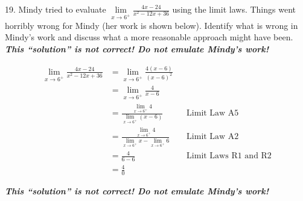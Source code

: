 \documentclass[12pt,]{book}
\newcommand{\alert}[1]{\textbf{\textit{#1}}}
\theoremstyle{plain}
\theoremstyle{definition}
\theoremstyle{definition}
\theoremstyle{definition}
\theoremstyle{definition}
\theoremstyle{definition}
\numberwithin{equation}{section}
\begin{document}
\begin{exerciselist}
\begin{exercisegroup}
\end{exercisegroup}
\par\smallskip\noindent
\item[19.]\hypertarget{exercise-108}{}Mindy tried to evaluate \(\lim\limits_{x\to6^{+}}\frac{4x-24}{x^2-12x+36}\) using the limit laws. Things went horribly wrong for Mindy (her work is shown below). Identify what is wrong in Mindy's work and discuss what a more reasonable approach might have been. \alert{This ``solution'' is not correct! Do not emulate Mindy's work!}%
\par
\begin{align*}
\lim_{x\to6^{+}}\frac{4x-24}{x^2-12x+36}&=\lim_{x\to6^{+}}\frac{4(x-6)}{(x-6)^2}\\
&=\lim_{x\to6^{+}}\frac{4}{x-6}\\
&=\frac{\lim\limits_{x\to6^{+}}4}{\lim\limits_{x\to6^{+}}(x-6)}&&\text{Limit Law A5}\\
&=\frac{\lim\limits_{x\to6^{+}}4}{\lim\limits_{x\to6^{+}}x-\lim\limits_{x\to6^{+}}6}&&\text{Limit Law A2}\\
&=\frac{4}{6-6}&&\text{Limit Laws R1 and R2}\\
&=\frac{4}{0}
\end{align*}%
\par
\alert{This ``solution'' is not correct! Do not emulate Mindy's work!}%
\par\smallskip
\end{exerciselist}
\typeout{************************************************}
\typeout{************************************************}
\end{document}
